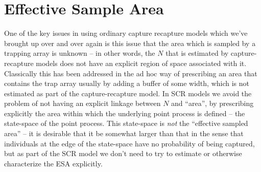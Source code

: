 {


\section{Effective Sample Area}
\label{scr0.sec.esa}

One of the key issues in using ordinary capture recapture models which
we've brought up over and over again is this issue that the area which
is sampled by a trapping array is unknown -- in other words, the $N$
that is estimated by capture-recapture models does not have an
explicit region of space associated with it.  Classically this has
been addressed in the ad hoc way of prescribing an area that contains
the trap array usually by adding a buffer of some width, which is not
estimated as part of the capture-recapture model.  In SCR models we
avoid the problem of not having an explicit linkage between $N$ and
``area'', by prescribing explicitly the area within which the
underlying point process is defined -- the state-space of the point
process.  This state-space is {\it not} the ``effective sampled area''
-- it is desirable that it be somewhat larger than that in the sense
that individuals at the edge of the state-space have no probability of
being captured, but as part of the SCR model we don't need to try to
estimate or otherwise characterize the ESA explicitly.

}
